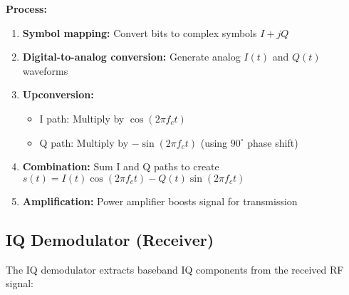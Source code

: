 \textbf{Process:}
\begin{enumerate}
\item \textbf{Symbol mapping:} Convert bits to complex symbols $I + jQ$
\item \textbf{Digital-to-analog conversion:} Generate analog $I(t)$ and $Q(t)$ waveforms
\item \textbf{Upconversion:}
  \begin{itemize}
  \item I path: Multiply by $\cos(2\pi f_c t)$
  \item Q path: Multiply by $-\sin(2\pi f_c t)$ (using $90^\circ$ phase shift)
  \end{itemize}
\item \textbf{Combination:} Sum I and Q paths to create $s(t) = I(t)\cos(2\pi f_c t) - Q(t)\sin(2\pi f_c t)$
\item \textbf{Amplification:} Power amplifier boosts signal for transmission
\end{enumerate}

\subsection{IQ Demodulator (Receiver)}

The IQ demodulator extracts baseband IQ components from the received RF signal:


